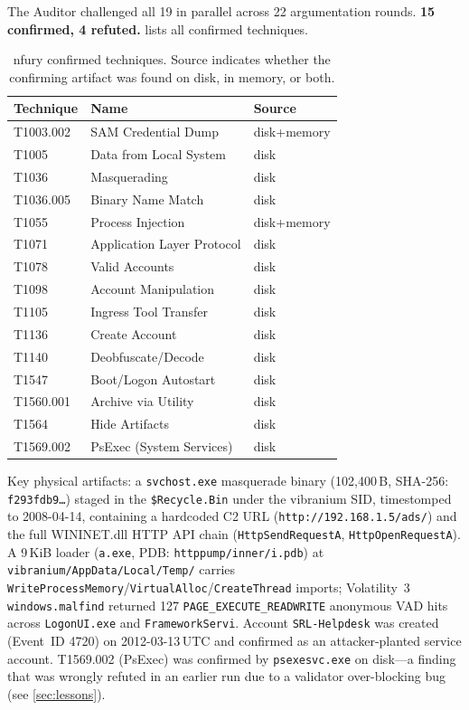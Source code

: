 \documentclass[sigconf, nonacm]{acmart}
\begin{document}
The Auditor challenged all 19 in parallel across 22 argumentation rounds.
\textbf{15 confirmed, 4 refuted.}  lists all confirmed
techniques.

\begin{table}[ht]
\centering\small
\caption{nfury confirmed techniques. Source indicates whether the
  confirming artifact was found on disk, in memory, or both.}
\label{tab:nfury}
\begin{tabular}{@{}lll@{}}
\toprule
Technique & Name & Source \\
\midrule
T1003.002 & SAM Credential Dump & disk+memory \\
T1005     & Data from Local System & disk \\
T1036     & Masquerading & disk \\
T1036.005 & Binary Name Match & disk \\
T1055     & Process Injection & disk+memory \\
T1071     & Application Layer Protocol & disk \\
T1078     & Valid Accounts & disk \\
T1098     & Account Manipulation & disk \\
T1105     & Ingress Tool Transfer & disk \\
T1136     & Create Account & disk \\
T1140     & Deobfuscate/Decode & disk \\
T1547     & Boot/Logon Autostart & disk \\
T1560.001 & Archive via Utility & disk \\
T1564     & Hide Artifacts & disk \\
T1569.002 & PsExec (System Services) & disk \\
\bottomrule
\end{tabular}
\end{table}

Key physical artifacts: a \texttt{svchost.exe} masquerade binary
(102,400\,B, SHA-256: \texttt{f293fdb9\ldots}) staged in the
\texttt{\$Recycle.Bin} under the vibranium SID, timestomped to
2008-04-14, containing a hardcoded C2 URL
(\texttt{http://192.168.1.5/ads/}) and the full WININET.dll HTTP API
chain (\texttt{HttpSendRequestA}, \texttt{HttpOpenRequestA}). A 9\,KiB
loader (\texttt{a.exe}, PDB: \texttt{httppump/inner/i.pdb}) at
\texttt{vibranium/AppData/Local/Temp/} carries
\texttt{WriteProcessMemory}/\texttt{VirtualAlloc}/\texttt{CreateThread}
imports; Volatility~3 \texttt{windows.malfind} returned 127
\texttt{PAGE\_EXECUTE\_READWRITE} anonymous VAD hits across
\texttt{LogonUI.exe} and \texttt{FrameworkServi}. Account \texttt{SRL-Helpdesk}
was created (Event~ID 4720) on 2012-03-13\,UTC and confirmed as an
attacker-planted service account. T1569.002 (PsExec) was confirmed by
\texttt{psexesvc.exe} on disk---a finding that was wrongly refuted in
an earlier run due to a validator over-blocking bug (see
\cref{sec:lessons}).
\end{document}
